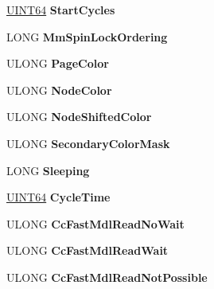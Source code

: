 \begin{DoxyCompactItemize}
\item 
\mbox{\label{struct___k_p_r_c_b_a3812b8ee1b024df5f169c4f32d4a223a}} 
\hyperlink{_processor_bind_8h_a57be03562867144161c1bfee95ca8f7c}{U\+I\+N\+T64} {\bfseries Start\+Cycles}
\item 
\mbox{\label{struct___k_p_r_c_b_aa5d9d1fd63beb303e0964746b43f28b6}} 
L\+O\+NG {\bfseries Mm\+Spin\+Lock\+Ordering}
\item 
\mbox{\label{struct___k_p_r_c_b_a5ac6eebdde1829cd0db489a48145890c}} 
U\+L\+O\+NG {\bfseries Page\+Color}
\item 
\mbox{\label{struct___k_p_r_c_b_a8c8b44c59ad8dabda286299c88023196}} 
U\+L\+O\+NG {\bfseries Node\+Color}
\item 
\mbox{\label{struct___k_p_r_c_b_adc408b610c85d42d063e691b37177c39}} 
U\+L\+O\+NG {\bfseries Node\+Shifted\+Color}
\item 
\mbox{\label{struct___k_p_r_c_b_ab9838d1ff23ca98da547b47efa9ea17d}} 
U\+L\+O\+NG {\bfseries Secondary\+Color\+Mask}
\item 
\mbox{\label{struct___k_p_r_c_b_a3b54fdec12a108e74aa163c65d789bd2}} 
L\+O\+NG {\bfseries Sleeping}
\item 
\mbox{\label{struct___k_p_r_c_b_a6e71e44836f872f3fabeb6b6cd37daf3}} 
\hyperlink{_processor_bind_8h_a57be03562867144161c1bfee95ca8f7c}{U\+I\+N\+T64} {\bfseries Cycle\+Time}
\item 
\mbox{\label{struct___k_p_r_c_b_a97d69f7b7a63cb869a2be5a27964a981}} 
U\+L\+O\+NG {\bfseries Cc\+Fast\+Mdl\+Read\+No\+Wait}
\item 
\mbox{\label{struct___k_p_r_c_b_a7adb09c74cbe1112130c9a425f49f50d}} 
U\+L\+O\+NG {\bfseries Cc\+Fast\+Mdl\+Read\+Wait}
\item 
\mbox{\label{struct___k_p_r_c_b_ae7b47c36b183131c13ef6b1d890521cf}} 
U\+L\+O\+NG {\bfseries Cc\+Fast\+Mdl\+Read\+Not\+Possible}

\end{DoxyCompactItemize}
